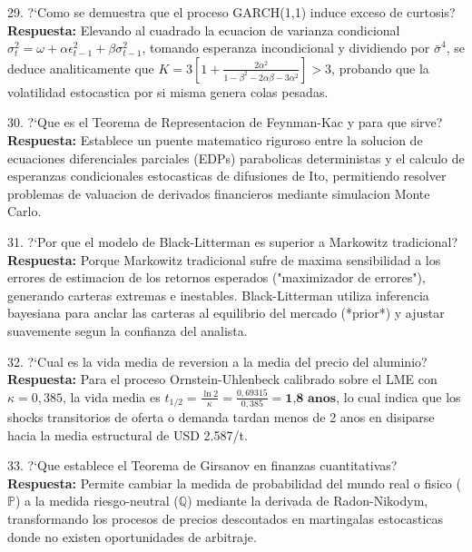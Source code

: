 \documentclass[10pt,a4paper]{article}
\theoremstyle{definition}
\begin{document}
\begin{examquestion}{29. ?`Como se demuestra que el proceso GARCH(1,1) induce exceso de curtosis?}
\textbf{Respuesta:} Elevando al cuadrado la ecuacion de varianza condicional $\sigma_t^2 = \omega + \alpha \epsilon_{t-1}^2 + \beta \sigma_{t-1}^2$, tomando esperanza incondicional y dividiendo por $\bar{\sigma}^4$, se deduce analiticamente que $K = 3\left[1 + \frac{2\alpha^2}{1-\beta^2-2\alpha\beta-3\alpha^2}\right] > 3$, probando que la volatilidad estocastica por si misma genera colas pesadas.
\end{examquestion}

\begin{examquestion}{30. ?`Que es el Teorema de Representacion de Feynman-Kac y para que sirve?}
\textbf{Respuesta:} Establece un puente matematico riguroso entre la solucion de ecuaciones diferenciales parciales (EDPs) parabolicas deterministas y el calculo de esperanzas condicionales estocasticas de difusiones de Ito, permitiendo resolver problemas de valuacion de derivados financieros mediante simulacion Monte Carlo.
\end{examquestion}

\begin{examquestion}{31. ?`Por que el modelo de Black-Litterman es superior a Markowitz tradicional?}
\textbf{Respuesta:} Porque Markowitz tradicional sufre de maxima sensibilidad a los errores de estimacion de los retornos esperados ("maximizador de errores"), generando carteras extremas e inestables. Black-Litterman utiliza inferencia bayesiana para anclar las carteras al equilibrio del mercado (*prior*) y ajustar suavemente segun la confianza del analista.
\end{examquestion}

\begin{examquestion}{32. ?`Cual es la vida media de reversion a la media del precio del aluminio?}
\textbf{Respuesta:} Para el proceso Ornstein-Uhlenbeck calibrado sobre el LME con $\kappa = 0,385$, la vida media es $t_{1/2} = \frac{\ln 2}{\kappa} = \frac{0,69315}{0,385} = \textbf{1,8 anos}$, lo cual indica que los shocks transitorios de oferta o demanda tardan menos de 2 anos en disiparse hacia la media estructural de USD 2.587/t.
\end{examquestion}

\begin{examquestion}{33. ?`Que establece el Teorema de Girsanov en finanzas cuantitativas?}
\textbf{Respuesta:} Permite cambiar la medida de probabilidad del mundo real o fisico ($\mathbb{P}$) a la medida riesgo-neutral ($\mathbb{Q}$) mediante la derivada de Radon-Nikodym, transformando los procesos de precios descontados en martingalas estocasticas donde no existen oportunidades de arbitraje.
\end{examquestion}
\end{document}
